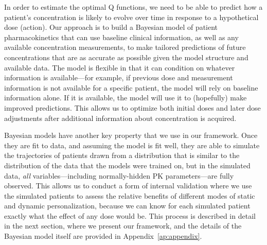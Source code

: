 In order to estimate the optimal Q functions, we need to be able to predict how a patient's concentration is likely to evolve over time in response to a hypothetical dose (action).  Our approach is to build a Bayesian model of patient pharmacokinetics that can use baseline clinical information, as well as any available concentration measurements, to make tailored predictions of future concentrations that are as accurate as possible given the model structure and available data. The model is flexible in that it can condition on whatever information is available---for example, if previous dose and measurement information is not available for a specific patient, the model will rely on baseline information alone. If it is available, the model will use it to (hopefully) make improved predictions. This allows us to optimize both initial doses and later dose adjustments after additional information about concentration is acquired.

Bayesian models have another key property that we use in our framework. Once they are fit to data, and assuming the model is fit well, they are able to simulate the trajectories of patients drawn from a distribution that is similar to the distribution of the data that the models were trained on, but in the simulated data, \textit{all} variables---including normally-hidden PK parameters---are fully observed. This allows us to conduct a form of internal validation where we use the simulated patients to assess the relative benefits of different modes of static and dynamic personalization, because we can know for each simulated patient exactly what the effect of any dose would be. This process is described in detail in the next section, where we present our framework, and the details of the Bayesian model itself are provided in Appendix~\ref{ap:appendix}.
